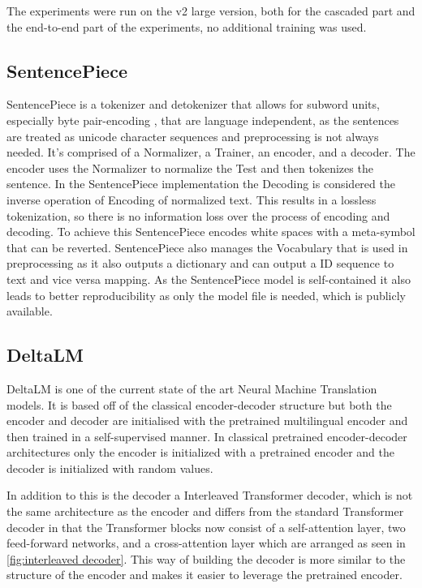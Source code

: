 The experiments were run on the v2 large version, both for the cascaded part and the end-to-end part of the experiments, no additional training was used.

\subsection{SentencePiece}
SentencePiece \cite{kudo-richardson-2018-sentencepiece} is a tokenizer and detokenizer that allows for subword units, especially byte pair-encoding \cite{sennrich-etal-2016-neural}, that are language independent, as the sentences are treated as unicode character sequences and preprocessing is not always needed. 
It's comprised of a Normalizer, a Trainer, an encoder, and a decoder. 
The encoder uses the Normalizer to normalize the Test and then tokenizes the sentence. 
In the SentencePiece implementation the Decoding is considered the inverse operation of Encoding of normalized text. This results in a lossless tokenization, so there is no information loss over the process of encoding and decoding. 
To achieve this SentencePiece encodes white spaces with a meta-symbol that can be reverted. 
SentencePiece also manages the Vocabulary that is used in preprocessing as it also outputs a dictionary and can output a ID sequence to text and vice versa mapping. 
As the SentencePiece model is self-contained it also leads to better reproducibility as only the model file is needed, which is publicly available. 

\subsection{DeltaLM}
DeltaLM \cite{ma2021deltalm} is one of the current state of the art Neural Machine Translation models. 
It is based off of the classical encoder-decoder structure but both the encoder and decoder are initialised with the pretrained multilingual encoder and then trained in a self-supervised manner. In classical pretrained encoder-decoder architectures only the encoder is initialized with a pretrained encoder and the decoder is initialized with random values.

In addition to this is the decoder a Interleaved Transformer decoder, which is not the same architecture as the encoder and differs from the standard Transformer decoder in that the Transformer blocks now consist of a self-attention layer, two feed-forward networks, and a cross-attention layer which are arranged as seen in \autoref{fig:interleaved decoder}. 
This way of building the decoder is more similar to the structure of the encoder and makes it easier to leverage the pretrained encoder. 

